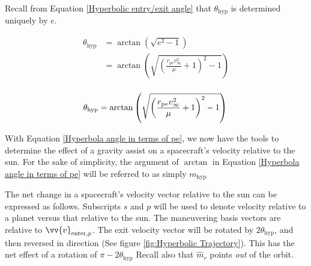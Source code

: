 \documentclass[../main.tex]{subfiles}
\begin{document}
Recall from Equation \eqref{Hyperbolic entry/exit angle} that $\theta_\text{hyp}$ is determined uniquely by $e$.

\begin{align*}
    \theta_\text{hyp} & =\arctan\left(\sqrt{e^2-1}\right)                                                \\
                      & =\arctan\left(\sqrt{\left(\frac{r_\text{pe}v_\infty^2}{\mu}+1\right)^2-1}\right) \\
\end{align*}

\begin{equation}\label{Hyperbola angle in terms of pe}
    \theta_\text{hyp}=\arctan\left(\sqrt{\left(\frac{r_\text{pe}v_\infty^2}{\mu}+1\right)^2-1}\right)\\
\end{equation}

With Equation \eqref{Hyperbola angle in terms of pe}, we now have the tools to determine the effect of a gravity assist on a spacecraft's velocity relative to the sun. For the sake of simplicity, the argument of $\arctan$ in Equation \eqref{Hyperbola angle in terms of pe} will be referred to as simply $m_\text{hyp}$

The net change in a spacecraft's velocity vector relative to the sun can be expressed as follows. Subscripts $s$ and $p$ will be used to denote velocity relative to a planet versus that relative to the sun. The maneuvering basis vectors are relative to $\vv{v}_{\text{enter},p}$. The exit velocity vector will be rotated by $2\theta_\text{hyp}$, and then reversed in direction (See figure \ref{fig:Hyperbolic Trajectory}). This has the net effect of a rotation of $\pi-2\theta_\text{hyp}$ Recall also that $\hat{m}_r$ points \textit{out} of the orbit.
\end{document}
